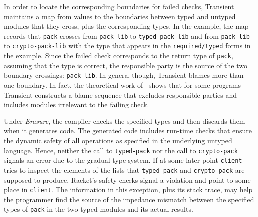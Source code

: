 In order to locate the corresponding boundaries for failed checks, Transient
maintains a map from values to the boundaries between typed and untyped modules that
they cross, plus the corresponding types. In the example, the map records that
\texttt{pack} crosses from \texttt{pack-lib} to {\tt typed-pack-lib} and
from {\tt pack-lib} to {\tt crypto-pack-lib} with the type that appears in the
{\tt required/typed} forms in the example. Since the failed check corresponds to
the return type of \texttt{pack}, assuming that the type is correct,
the responsible party is the source of the two
boundary crossings: \texttt{pack-lib}. In
general though, Transient blames more than one boundary. In fact, the theoretical
work of~\citet{gfd-oopsla-2019} shows that for some programs Transient
constructs a blame sequence that excludes responsible parties and includes modules
irrelevant to the failing check.

Under {\it Erasure\/}, the compiler checks the specified types and
then discards them when it generates code. The generated code includes run-time
checks that ensure the dynamic safety of all operations as specified in the
underlying untyped language. Hence, neither the call to {\tt typed-pack} nor the
call to {\tt crypto-pack} signals an error due to the gradual type system. If
at some later point {\tt client} tries to inspect the elements of the lists
that \texttt{typed-pack} and {\tt crypto-pack} are supposed to produce, Racket's
safety checks signal a violation and point to some place in {\tt client}. The
information in this exception, plus its stack trace, may help the programmer
find the source of the impedance mismatch between the specified types of
{\tt pack} in the two typed modules and its actual results.

